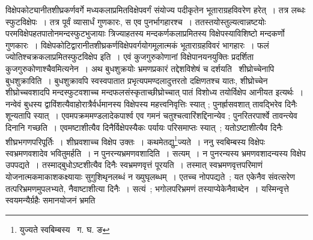 \documentclass[11pt, openany]{book}
\begin{document}
\noindent विक्षेपकोट्यानीतशीघ्रकर्णवर्गे मध्यकलाप्रमितविक्षेपवर्गं संयोज्य पदीकृतेन भूताराग्रहविवरेण हरेत्~। तत्र लब्धः स्फुटविक्षेपः~। तत्र पूर्वं व्यासार्धं गुणकारः, स एव पुनर्भागहारश्च~। ततस्तयोस्तुल्यत्वान्नष्टयोः परमविक्षेपहतपातोनमन्दस्फुटभुजायाः त्रिज्याहतस्य 
मन्दकर्णकलाप्रमितस्य विक्षेपस्याविशिष्टो मन्दकर्णो गुणकारः~। विक्षेपकोटिद्वारानीतशीघ्रकर्णविक्षेपवर्गयोगमूलात्मकं भूताराग्रहविवरं भागहारः~। फलं ज्योतिश्चक्रकलाप्रमितस्फुटविक्षेप इति~। एवं कुजगुरुकोणानां विक्षेपानयनयुक्तिः प्रदर्शिता कुजगुरुकोणाश्चैवमित्यनेन~। अथ बुधशुक्रयोः भ्रमणप्रकारं तद्देशविशेषं च दर्शयति \textendash\ शीघ्रोच्चेनापि बुधशुक्राविति~। बुधशुक्रावपि स्वस्वपातात प्रभृत्यपमण्दलादुत्तरतो दक्षिणतश्च यातः, शीघ्रोच्चेन शीघ्रोच्चवशादपि मन्दस्फुटवशाच्च मन्दफलसंस्कृताच्छीघ्रोच्चात् पातं विशोध्य तयोर्विक्षेप आनीयत 
इत्यर्थः~। नन्वेवं बुधस्य द्वाविंशत्यैवाहोरात्रैर्वर्धमानस्य विक्षेपस्य महत्त्वनिवृत्तिः स्यात् ; पुनर्ह्रासवशात् तावद्भिरेव
दिनैः शून्यतापि स्यात्~। एवमपक्रममण्डलादेकपार्श्व एव गमनं चतुश्चत्वारिंशद्दिनान्येव ; पुनरितरपार्श्वे तावन्त्येव दिनानि 
गच्छति~। एवमष्टाशीत्यैव दिनैर्विक्षेपस्यैकः पर्यायः परिसमाप्तः स्यात्~; यतोऽष्टाशीत्यैव दिनैः शीघ्रभगणपरिपूर्तिः~। 
शीघ्रवशाच्च विक्षेप उक्तः~। कथमेतद्यु\renewcommand{\thefootnote}{१}\footnote{युज्यते स्वबिम्बस्य \textendash\ ग. घ. ङ}ज्यते~। ननु स्वबिम्बस्य विक्षेपः स्वभ्रमणवशादेव भवितुमर्हति~। न पुनरन्यभ्रमणवशादिति~। 
सत्यम्~। न पुनरन्यस्य भ्रमणवशादन्यस्य विक्षेप उपपद्यते~। तस्माद्बुधोऽष्टशीत्यैव दिनैः स्वभ्रमणवृत्तं पूरयति~। तस्मात् 
स्वभ्रमणवृत्तपरिमाणं योजनात्मकमाकाशकक्ष्यायाः सुगुशिथृनलब्धं न ख्युघृलब्धम्~। एतच्च नोपपद्यते~; यत एकेनैव संवत्सरेण 
तत्परिभ्रमणमुपलभ्यते, नैवाष्टाशीत्या दिनैः~। सत्यं~; भगोलपरिभ्रमणं तस्याप्येकेनैवाब्देन~। यस्मिन्वृत्ते 
स्वयमन्यैर्ग्रहैः समानयोजनं भ्रमति 

\newpage
\end{document}
